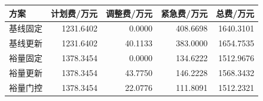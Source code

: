 \begin{tabular}{lrrrr}
\toprule
方案 & 计划费/万元 & 调整费/万元 & 紧急费/万元 & 总费/万元 \\
\midrule
基线固定 & 1231.6402 & 0.0000 & 408.6698 & 1640.3101 \\
基线更新 & 1231.6402 & 40.1133 & 383.0000 & 1654.7535 \\
裕量固定 & 1378.3454 & 0.0000 & 134.6222 & 1512.9676 \\
裕量更新 & 1378.3454 & 43.7750 & 146.2228 & 1568.3432 \\
裕量门控 & 1378.3454 & 22.0776 & 111.8091 & 1512.2321 \\
\bottomrule
\end{tabular}
